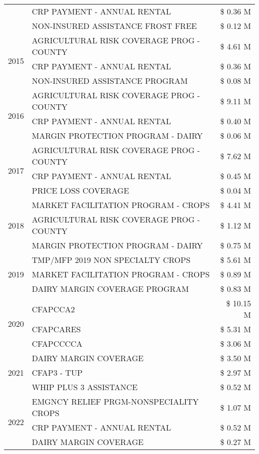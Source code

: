 \begin{tabular}{llr}
 & CRP PAYMENT - ANNUAL RENTAL & \$ 0.36 M \\
 & NON-INSURED ASSISTANCE FROST FREE & \$ 0.12 M \\
\cline{1-3}
\multirow[t]{3}{*}{2015} & AGRICULTURAL RISK COVERAGE PROG - COUNTY & \$ 4.61 M \\
 & CRP PAYMENT - ANNUAL RENTAL & \$ 0.36 M \\
 & NON-INSURED ASSISTANCE PROGRAM & \$ 0.08 M \\
\cline{1-3}
\multirow[t]{3}{*}{2016} & AGRICULTURAL RISK COVERAGE PROG - COUNTY & \$ 9.11 M \\
 & CRP PAYMENT - ANNUAL RENTAL & \$ 0.40 M \\
 & MARGIN PROTECTION PROGRAM - DAIRY & \$ 0.06 M \\
\cline{1-3}
\multirow[t]{3}{*}{2017} & AGRICULTURAL RISK COVERAGE PROG - COUNTY & \$ 7.62 M \\
 & CRP PAYMENT - ANNUAL RENTAL & \$ 0.45 M \\
 & PRICE LOSS COVERAGE & \$ 0.04 M \\
\cline{1-3}
\multirow[t]{3}{*}{2018} & MARKET FACILITATION PROGRAM - CROPS & \$ 4.41 M \\
 & AGRICULTURAL RISK COVERAGE PROG - COUNTY & \$ 1.12 M \\
 & MARGIN PROTECTION PROGRAM - DAIRY & \$ 0.75 M \\
\cline{1-3}
\multirow[t]{3}{*}{2019} & TMP/MFP 2019 NON SPECIALTY CROPS & \$ 5.61 M \\
 & MARKET FACILITATION PROGRAM - CROPS & \$ 0.89 M \\
 & DAIRY MARGIN COVERAGE PROGRAM & \$ 0.83 M \\
\cline{1-3}
\multirow[t]{3}{*}{2020} & CFAPCCA2 & \$ 10.15 M \\
 & CFAPCARES & \$ 5.31 M \\
 & CFAPCCCCA & \$ 3.06 M \\
\cline{1-3}
\multirow[t]{3}{*}{2021} & DAIRY MARGIN COVERAGE & \$ 3.50 M \\
 & CFAP3 - TUP & \$ 2.97 M \\
 & WHIP PLUS 3 ASSISTANCE & \$ 0.52 M \\
\cline{1-3}
\multirow[t]{3}{*}{2022} & EMGNCY RELIEF PRGM-NONSPECIALITY CROPS & \$ 1.07 M \\
 & CRP PAYMENT - ANNUAL RENTAL & \$ 0.52 M \\
 & DAIRY MARGIN COVERAGE & \$ 0.27 M \\
\cline{1-3}
\bottomrule
\end{tabular}

